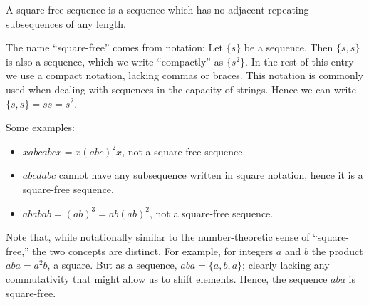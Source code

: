 \documentclass[12pt]{article}
\begin{document}
A square-free sequence is a sequence which has no adjacent repeating subsequences of any length.  

The name ``square-free'' comes from notation: Let $\{s\}$ be a sequence.    Then $\{s,s\}$ is also a sequence, which we write ``compactly'' as $\{s^2\}$.  In the rest of this entry we use a compact notation, lacking commas or braces.  This notation is commonly used when dealing with sequences in the capacity of strings. Hence we can write $\{s,s\} = ss = s^2$.

Some examples:

\begin{itemize}
\item $xabcabcx = x(abc)^2x$, not a square-free sequence.
\item $abcdabc$ cannot have any subsequence written in square notation, hence it is a square-free sequence.
\item $ababab = (ab)^3 = ab(ab)^2$, not a square-free sequence.
\end{itemize}

Note that, while notationally similar to the number-theoretic sense of ``square-free,'' the two concepts are distinct.  For example, for integers $a$ and $b$ the product $aba = a^2b$, a square.   But as a sequence, $aba = \{a,b,a\}$; clearly lacking any commutativity that might allow us to shift elements.  Hence, the sequence $aba$ is square-free.
\end{document}
